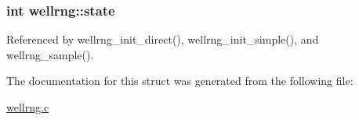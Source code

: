 \subsubsection[{\texorpdfstring{state}{state}}]{\setlength{\rightskip}{0pt plus 5cm}int wellrng\+::state}\hypertarget{structwellrng_adac1ae0316c2b966f62efbe228f85a85}{}\label{structwellrng_adac1ae0316c2b966f62efbe228f85a85}


Referenced by wellrng\+\_\+init\+\_\+direct(), wellrng\+\_\+init\+\_\+simple(), and wellrng\+\_\+sample().



The documentation for this struct was generated from the following file\+:\begin{DoxyCompactItemize}
\item 
\hyperlink{wellrng_8c}{wellrng.\+c}\end{DoxyCompactItemize}

